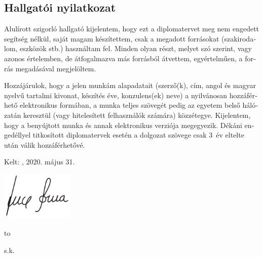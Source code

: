 \begin{otherlanguage}{magyar}

  \chapter*{Hallgatói nyilatkozat}
  \thispagestyle{plain}

  Alulírott \textbf{\authorihun} szigorló hallgató kijelentem, hogy ezt
  a diplomatervet meg nem engedett segítség nélkül, saját magam
  készítettem, csak a megadott forrásokat (szakirodalom, eszközök stb.)
  használtam fel. Minden olyan részt, melyet szó szerint, vagy azonos
  értelemben, de átfogalmazva más forrásból átvettem, egyértelműen, a
  forrás megadásával megjelöltem.

  Hozzájárulok, hogy a jelen munkám alapadatait (szerző(k), cím, angol
  és magyar nyelvű tartalmi kivonat, készítés éve, konzulens(ek) neve) a
    nyilvánosan hozzáférhető elektronikus
  formában, a munka teljes szövegét pedig az egyetem belső hálózatán
  keresztül (vagy hitelesített felhasználók számára)
  közzétegye. Kijelentem, hogy a benyújtott munka és annak elektronikus
  verziója megegyezik. Dékáni engedéllyel titkosított diplomatervek
  esetén a dolgozat szövege csak 3~év eltelte után válik hozzáférhetővé.

  \vspace{4ex}

  \noindent Kelt: \viktdklocation, 2020. május 31.

  \vspace{-5mm}

  \hfill\begin{minipage}{0.4\linewidth}
    \centering\includegraphics[width=35mm,clip]{figures/soma-lucz-signature.pdf}\par
    \vspace{-5mm}
    \centering\hbox to \par
    \centering\authorihun\par
    \centering s.k.\par
  \end{minipage}

\end{otherlanguage}

